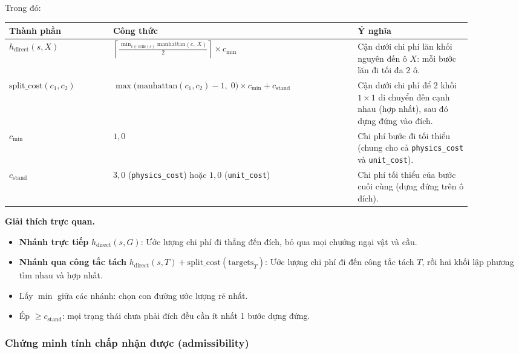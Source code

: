 Trong đó:

{\small\renewcommand{\arraystretch}{1.25}
\begin{longtable}{|>{\raggedright\arraybackslash}p{0.200\linewidth}|>{\raggedright\arraybackslash}p{0.470\linewidth}|>{\raggedright\arraybackslash}p{0.225\linewidth}|}
\hline
\textbf{Thành phần} & \textbf{Công thức} & \textbf{Ý nghĩa} \\ \hline
\endhead
\hline
\endlastfoot
$h_{\text{direct}}(s, X)$ & $\left\lceil \frac{\min_{c \in \text{cells}(s)} \text{manhattan}(c,\, X)}{2} \right\rceil \times c_{\min}$ & Cận dưới chi phí lăn khối nguyên đến ô $X$: mỗi bước lăn đi tối đa 2 ô. \\ \hline
$\text{split\_cost}(c_1, c_2)$ & $\max\!\big(\text{manhattan}(c_1, c_2) - 1,\; 0\big) \times c_{\min} + c_{\text{stand}}$ & Cận dưới chi phí để 2 khối $1\times 1$ di chuyển đến cạnh nhau (hợp nhất), sau đó dựng đứng vào đích. \\ \hline
$c_{\min}$ & $1{,}0$ & Chi phí bước đi tối thiểu (chung cho cả \texttt{physics\_\allowbreak{}cost} và \texttt{unit\_\allowbreak{}cost}). \\ \hline
$c_{\text{stand}}$ & $3{,}0$ (\texttt{physics\_\allowbreak{}cost}) hoặc $1{,}0$ (\texttt{unit\_\allowbreak{}cost}) & Chi phí tối thiểu của bước cuối cùng (dựng đứng trên ô đích). \\
\end{longtable}
}

\textbf{Giải thích trực quan.}

\begin{itemize}
\item \textbf{Nhánh trực tiếp} $h_{\text{direct}}(s, G)$: Ước lượng chi phí đi thẳng đến đích, bỏ qua mọi chướng ngại vật và cầu.
\item \textbf{Nhánh qua công tắc tách} $h_{\text{direct}}(s, T) + \text{split\_cost}(\text{targets}_T)$: Ước lượng chi phí đi đến công tắc tách $T$, rồi hai khối lập phương tìm nhau và hợp nhất.
\item Lấy $\min$ giữa các nhánh: chọn con đường ước lượng rẻ nhất.
\item Ép $\ge c_{\text{stand}}$: mọi trạng thái chưa phải đích đều cần ít nhất 1 bước dựng đứng.
\end{itemize}

\subsubsection{Chứng minh tính chấp nhận được (admissibility)}

